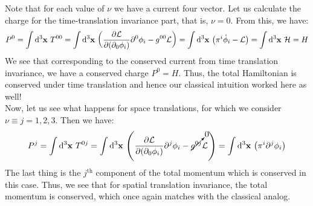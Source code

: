 Note that for each value of $\nu$ we have a current four vector. Let us calculate the charge for the time-translation invariance part, that is, $\nu=0$. From this, we have:
$$P^0 = \int \dd^3 \vb{x} \ T^{00} = \int \dd^3 \vb{x} \ \qty( \pdv{\mathcal L}{(\partial_0 \phi_i)}\partial^0\phi_i-g^{00}\mathcal L) = \int \dd^3 \vb{x} \ \qty(\pi^i \dot{\phi}_i - \mathcal L) = \int \dd^3 \vb{x} \ \mathcal H = H$$
We see that corresponding to the conserved current from time translation invariance, we have a conserved charge $P^0 = H$. Thus, the total Hamiltonian is conserved under time translation and hence our classical intuition worked here as well!\\[0.2cm]
Now, let us see what happens for space translations, for which we consider $\nu\equiv j = 1,2,3$. Then we have:
$$P^j = \int \dd^3 \vb{x} \ T^{0j} = \int \dd^3 \vb{x} \ \qty( \pdv{\SL}{(\partial_0 \phi_i)}\partial^j\phi_i-\cancelto{0}{g^{0j}}\SL) = \int \dd^3 \vb{x}\ \qty(\pi^i \partial^j\phi_i)$$
The last thing is the $j^{\mathrm{th}}$ component of the total momentum which is conserved in this case. Thus, we see that for spatial translation invariance, the total momentum is conserved, which once again matches with the classical analog.
